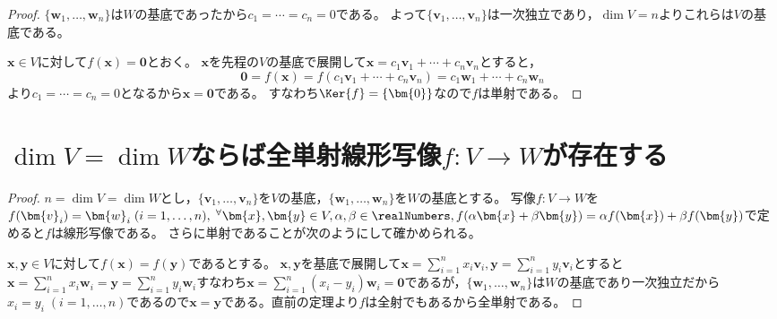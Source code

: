 \begin{proof}
            $\{\bm{w}_1,\dotsc,\bm{w}_n\}$は$W$の基底であったから$c_1=\dotsb=c_n=0$である。
            よって$\{\bm{v}_1,\dotsc,\bm{v}_n\}$は一次独立であり，$\dim{V}=n$よりこれらは$V$の基底である。
            \par
            $\bm{x}\in V$に対して$f(\bm{x})=\bm{0}$とおく。
            $\bm{x}$を先程の$V$の基底で展開して$\bm{x}=c_1\bm{v}_1+\dotsb+c_n\bm{v}_n$とすると，
            \[\bm{0} = f(\bm{x}) = f(c_1\bm{v}_1+\dotsb+c_n\bm{v}_n) = c_1\bm{w}_1 + \dotsb + c_n\bm{w}_n\]
            より$c_1=\dotsb=c_n=0$となるから$\bm{x}=\bm{0}$である。
            すなわち$\Ker{f}=\{\bm{0}\}$なので$f$は単射である。
        \end{proof}
    \section{\texorpdfstring{$\dim{V}=\dim{W}$}{dim(V)=dim(W)}ならば全単射線形写像\texorpdfstring{$f:V\to W$}{f:V→W}が存在する}
        \begin{proof}
            \quad\par
            $n=\dim{V}=\dim{W}$とし，$\{\bm{v}_1,\dotsc,\bm{v}_n\}$を$V$の基底，$\{\bm{w}_1,\dotsc,\bm{w}_n\}$を$W$の基底とする。
            写像$f:V\to W$を$f(\bm{v}_i)=\bm{w}_i\;(i=1,\dotsc,n),\;^\forall\bm{x},\bm{y}\in V,\alpha,\beta\in\realNumbers,f(\alpha\bm{x}+\beta\bm{y})=\alpha f(\bm{x})+\beta f(\bm{y})$で定めると$f$は線形写像である。
            さらに単射であることが次のようにして確かめられる。
            \par
            $\bm{x},\bm{y}\in V$に対して$f(\bm{x})=f(\bm{y})$であるとする。
            $\bm{x},\bm{y}$を基底で展開して$\bm{x}=\sum_{i=1}^n x_i\bm{v}_i, \bm{y}=\sum_{i=1}^n y_i\bm{v}_i$とすると$\bm{x}=\sum_{i=1}^n x_i\bm{w}_i = \bm{y}=\sum_{i=1}^n y_i\bm{w}_i$すなわち$\bm{x}=\sum_{i=1}^n (x_i-y_i)\bm{w}_i = \bm{0}$であるが，$\{\bm{w}_1,\dotsc,\bm{w}_n\}$は$W$の基底であり一次独立だから$x_i=y_i\;(i=1,\dotsc,n)$であるので$\bm{x}=\bm{y}$である。直前の定理より$f$は全射でもあるから全単射である。
        \end{proof}
